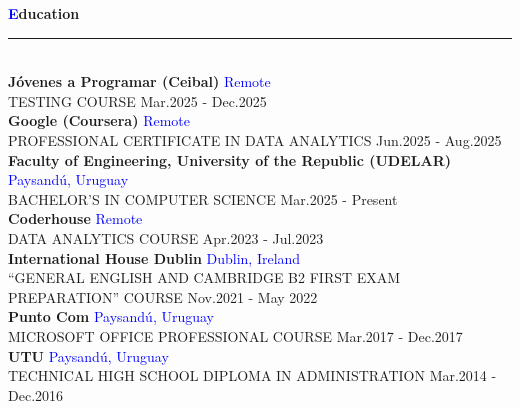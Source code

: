 \documentclass[a4paper,10pt]{article}
\begin{document}
\begin{spacing}{1.1}
\noindent
{\Large\textbf{\textcolor{blue}{E}ducation}}
\hspace{0.3em}\rule[0.5ex]{\dimexpr\textwidth-15em}{0.4pt} \\[6pt]
\textbf{Jóvenes a Programar (Ceibal)} \hfill \textcolor{blue}{Remote} \\
TESTING COURSE \hfill Mar.2025 - Dec.2025 \\
\textbf{Google (Coursera)} \hfill \textcolor{blue}{Remote} \\
PROFESSIONAL CERTIFICATE IN DATA ANALYTICS \hfill Jun.2025 - Aug.2025  \\
\textbf{Faculty of Engineering, University of the Republic (UDELAR)} \hfill \textcolor{blue}{Paysandú, Uruguay} \\
BACHELOR’S IN COMPUTER SCIENCE \hfill Mar.2025 - Present \\
\textbf{Coderhouse} \hfill \textcolor{blue}{Remote} \\
DATA ANALYTICS COURSE \hfill Apr.2023 - Jul.2023 \\
\textbf{International House Dublin} \hfill \textcolor{blue}{Dublin, Ireland} \\
“GENERAL ENGLISH AND CAMBRIDGE B2 FIRST EXAM PREPARATION” COURSE \hfill Nov.2021 - May 2022 \\
\textbf{Punto Com} \hfill \textcolor{blue}{Paysandú, Uruguay} \\
MICROSOFT OFFICE PROFESSIONAL COURSE \hfill Mar.2017 - Dec.2017 \\
\textbf{UTU} \hfill \textcolor{blue}{Paysandú, Uruguay} \\
TECHNICAL HIGH SCHOOL DIPLOMA IN ADMINISTRATION \hfill Mar.2014 - Dec.2016

\end{spacing}
\end{document}
